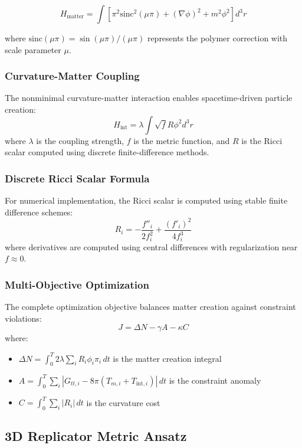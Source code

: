 \documentclass[11pt]{article}
\begin{document}
\[
H_{\text{matter}} = \int \left[ \pi^2 \text{sinc}^2(\mu \pi) + (\nabla \phi)^2 + m^2 \phi^2 \right] d^3r
\]

where $\text{sinc}(\mu \pi) = \sin(\mu \pi)/(\mu \pi)$ represents the polymer correction with scale parameter $\mu$.

\subsubsection*{Curvature-Matter Coupling}

The nonminimal curvature-matter interaction enables spacetime-driven particle creation:
\[
H_{\text{int}} = \lambda \int \sqrt{f} R \phi^2 d^3r
\]
where $\lambda$ is the coupling strength, $f$ is the metric function, and $R$ is the Ricci scalar computed using discrete finite-difference methods.

\subsubsection*{Discrete Ricci Scalar Formula}

For numerical implementation, the Ricci scalar is computed using stable finite difference schemes:
\[
R_i = -\frac{f''_i}{2f_i^2} + \frac{(f'_i)^2}{4f_i^3}
\]
where derivatives are computed using central differences with regularization near $f \approx 0$.

\subsubsection*{Multi-Objective Optimization}

The complete optimization objective balances matter creation against constraint violations:
\[
J = \Delta N - \gamma A - \kappa C
\]
where:
\begin{itemize}
\item $\Delta N = \int_0^T 2\lambda \sum_i R_i \phi_i \pi_i \, dt$ is the matter creation integral
\item $A = \int_0^T \sum_i |G_{tt,i} - 8\pi(T_{m,i} + T_{\text{int},i})| \, dt$ is the constraint anomaly
\item $C = \int_0^T \sum_i |R_i| \, dt$ is the curvature cost
\end{itemize}

\subsection*{3D Replicator Metric Ansatz}
\end{document}
